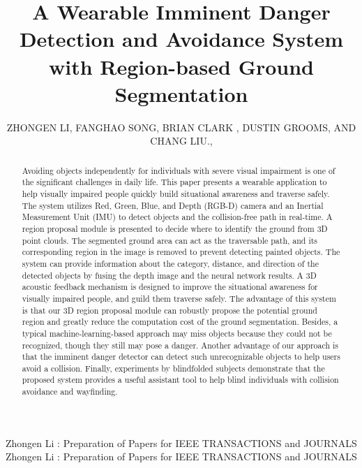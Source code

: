\documentclass{ieeeaccess}
\begin{document}


\title{A Wearable Imminent Danger Detection and Avoidance System with Region-based Ground Segmentation}
\author{\uppercase{Zhongen Li}, 
\uppercase{Fanghao Song, 
Brian Clark  , 
Dustin Grooms, and Chang Liu}.,
}
\address[1]{School of Electrical and Computer Engineering, Ohio University, Athens, OH 45701 USA}
\address[2]{Ohio Musculoskeletal and Neurological Institute, Ohio University, Athens, OH 45701 USA}
\address[3]{Department of Biomedical Sciences, Ohio University, Athens, OH 45701 USA}
\address[4]{College of Health Sciences and Professions, Ohio University, Athens, OH 45701 USA}
\markboth
{Zhongen Li \headeretal: Preparation of Papers for IEEE TRANSACTIONS and JOURNALS}
{Zhongen Li \headeretal: Preparation of Papers for IEEE TRANSACTIONS and JOURNALS}

\begin{abstract}
Avoiding objects independently for individuals with severe visual impairment is one of the significant challenges in daily life. This paper presents a wearable application to help visually impaired people quickly build situational awareness and traverse safely. The system utilizes Red, Green, Blue, and Depth (RGB-D) camera and an Inertial Measurement Unit (IMU) to detect objects and the collision-free path in real-time. A region proposal module is presented to decide where to identify the ground from 3D point clouds. The segmented ground area can act as the traversable path, and its corresponding region in the image is removed to prevent detecting painted objects. The system can provide information about the category, distance, and direction of the detected objects by fusing the depth image and the neural network results. A 3D acoustic feedback mechanism is designed to improve the situational awareness for visually impaired people, and guild them traverse safely. The advantage of this system is that our 3D region proposal module can robustly propose the potential ground region and greatly reduce the computation cost of the ground segmentation. Besides, a typical machine-learning-based approach may miss objects because they could not be recognized, though they still may pose a danger. Another advantage of our approach is that the imminent danger detector can detect such unrecognizable objects to help users avoid a collision. Finally, experiments by blindfolded subjects demonstrate that the proposed system provides a useful assistant tool to help blind individuals with collision avoidance and wayfinding.





\end{abstract}
\end{document}
